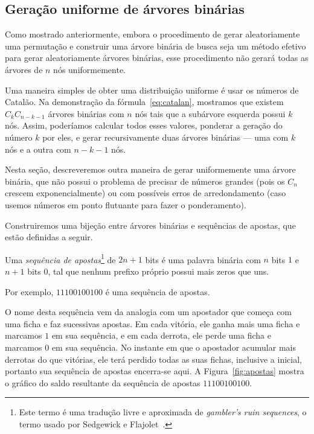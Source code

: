 \subsection{Geração uniforme de árvores binárias}

Como mostrado anteriormente,
embora o procedimento de gerar aleatoriamente uma permutação
e construir uma árvore binária de busca
seja um método efetivo para gerar aleatoriamente árvores binárias,
esse procedimento não gerará todas as árvores de $n$ nós uniformemente.

Uma maneira simples de obter uma distribuição uniforme
é usar os números de Catalão.
Na demonstração da fórmula~\ref{eq:catalan},
mostramos que existem $C_k C_{n-k-1}$ árvores binárias com $n$ nós
tais que a subárvore esquerda possui $k$ nós.
Assim,
poderíamos calcular todos esses valores,
ponderar a geração do número $k$ por eles,
e gerar recursivamente duas árvores binárias
--- uma com $k$ nós e a outra com $n - k - 1$ nós.

Nesta seção,
descreveremos outra maneira de gerar uniformemente uma árvore binária,
que não possui o problema de precisar de números grandes
(pois os $C_n$ crescem exponencialmente)
ou com possíveis erros de arredondamento
(caso usemos números em ponto flutuante para fazer o ponderamento).

Construiremos uma bijeção entre árvores binárias e sequências de apostas,
que estão definidas a seguir.

\begin{definition}
    Uma \emph{sequência de apostas}\footnote{
        Este termo é uma tradução livre e aproximada de \emph{gambler's ruin sequences},
        o termo usado por Sedgewick e Flajolet~\cite[p.~268]{SedgewickFlajolet2013}.
    }
    de $2n+1$ bits
    é uma palavra binária com $n$ bits $1$ e $n+1$ bits $0$,
    tal que
    nenhum prefixo próprio possui mais zeros que uns.
\end{definition}

Por exemplo, $11100100100$ é uma sequência de apostas.

O nome desta sequência vem da analogia com um apostador
que começa com uma ficha e faz sucessivas apostas.
Em cada vitória, ele ganha mais uma ficha e marcamos $1$ em sua sequência,
e em cada derrota, ele perde uma ficha e marcamos $0$ em sua sequência.
No instante em que o apostador acumular mais derrotas do que vitórias,
ele terá perdido todas as suas fichas, inclusive a inicial,
portanto sua sequência de apostas encerra-se aqui.
A Figura~\ref{fig:apostas}
mostra o gráfico do saldo resultante da sequência de apostas $11100100100$.

